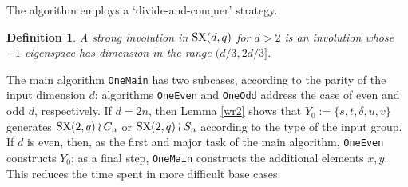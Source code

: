 \documentclass[12pt]{article}
\newtheorem{definition}{Definition}[section]
\def\SX{{\rm SX}}
\begin{document}
The algorithm employs a `divide-and-conquer' strategy. 
\begin{definition}
A {\it strong involution} in $\SX(d,q)$ for $d > 2$ is an involution whose
$-1$-eigenspace has dimension in the range $(d/3,2d/3]$. 
\end{definition}

The main algorithm {\tt OneMain} has two subcases,
according to the parity of the input dimension $d$:
algorithms {\tt OneEven} and {\tt OneOdd} 
address the case of even and odd $d$, respectively.
If $d = 2n$,  then Lemma \ref{wr2} shows that
$Y_0 := \{ s, t, \delta, u, v \}$
generates $\SX(2, q) \wr C_n$  or $\SX(2, q) \wr S_n$ according to the 
type of the input group.
If $d$ is even, then, as the first and major task of the 
main algorithm, 
{\tt OneEven} constructs $Y_0$; as a final step, 
{\tt OneMain} constructs the 
additional elements $x, y$.
This reduces the time spent in more difficult base cases.
\end{document}
